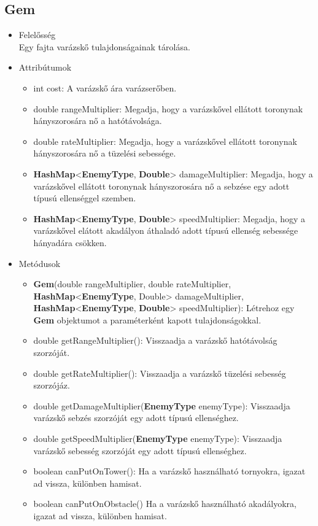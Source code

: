 \subsection{Gem}
\begin{itemize}
\item Felelősség\\
Egy fajta varázskő tulajdonságainak tárolása.
\item Attribútumok
	\begin{itemize}
		\item int cost: A varázskő ára varázserőben.
		\item double rangeMultiplier: Megadja, hogy a varázskővel ellátott toronynak hányszorosára nő a hatótávolsága.
		\item double rateMultiplier: Megadja, hogy a varázskővel ellátott toronynak hányszorosára nő a tüzelési sebessége.
		\item \textbf{HashMap}<\textbf{EnemyType}, \textbf{Double}> damageMultiplier: Megadja, hogy a varázskővel ellátott toronynak hányszorosára nő a sebzése egy adott típusú ellenséggel szemben.
		\item \textbf{HashMap}<\textbf{EnemyType}, \textbf{Double}> speedMultiplier: Megadja, hogy a varázskővel elátott akadályon áthaladó adott típusú ellenség sebessége hányadára csökken.
	\end{itemize}
\item Metódusok
	\begin{itemize}
		\item \textbf{Gem}(double rangeMultiplier, double rateMultiplier, \textbf{HashMap}<\textbf{EnemyType}, Double> damageMultiplier, \textbf{HashMap}<\textbf{EnemyType}, \textbf{Double}> speedMultiplier): Létrehoz egy \textbf{Gem} objektumot a paraméterként kapott tulajdonságokkal.
		\item double getRangeMultiplier(): Visszaadja a varázskő hatótávolság szorzóját.
		\item double getRateMultiplier(): Visszaadja a varázskő tüzelési sebesség szorzójáz.
		\item double getDamageMultiplier(\textbf{EnemyType} enemyType): Visszaadja varázskő sebzés szorzóját egy adott típusú ellenséghez.
		\item double getSpeedMultiplier(\textbf{EnemyType} enemyType): Visszaadja varázskő sebesség szorzóját egy adott típusú ellenséghez.
		\item boolean canPutOnTower(): Ha a varázskő használható tornyokra, igazat ad vissza, különben hamisat.
		\item boolean canPutOnObstacle() Ha a varázskő használható akadályokra, igazat ad vissza, különben hamisat.
	\end{itemize}
\end{itemize}


